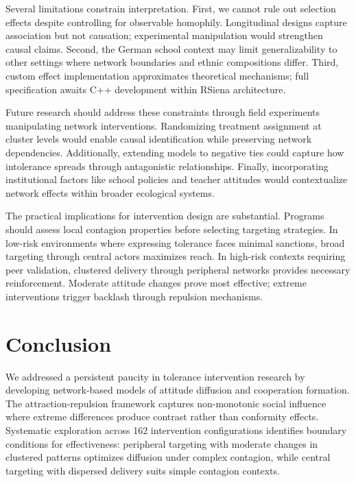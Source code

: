 \documentclass[12pt,a4paper]{article}
\begin{document}
Several limitations constrain interpretation. First, we cannot rule out selection effects despite controlling for observable homophily. Longitudinal designs capture association but not causation; experimental manipulation would strengthen causal claims. Second, the German school context may limit generalizability to other settings where network boundaries and ethnic compositions differ. Third, custom effect implementation approximates theoretical mechanisms; full specification awaits C++ development within RSiena architecture.

Future research should address these constraints through field experiments manipulating network interventions. Randomizing treatment assignment at cluster levels would enable causal identification while preserving network dependencies. Additionally, extending models to negative ties could capture how intolerance spreads through antagonistic relationships. Finally, incorporating institutional factors like school policies and teacher attitudes would contextualize network effects within broader ecological systems.

The practical implications for intervention design are substantial. Programs should assess local contagion properties before selecting targeting strategies. In low-risk environments where expressing tolerance faces minimal sanctions, broad targeting through central actors maximizes reach. In high-risk contexts requiring peer validation, clustered delivery through peripheral networks provides necessary reinforcement. Moderate attitude changes prove most effective; extreme interventions trigger backlash through repulsion mechanisms.


\section{Conclusion}

We addressed a persistent paucity in tolerance intervention research by developing network-based models of attitude diffusion and cooperation formation. The attraction-repulsion framework captures non-monotonic social influence where extreme differences produce contrast rather than conformity effects. Systematic exploration across 162 intervention configurations identifies boundary conditions for effectiveness: peripheral targeting with moderate changes in clustered patterns optimizes diffusion under complex contagion, while central targeting with dispersed delivery suits simple contagion contexts.
\end{document}
